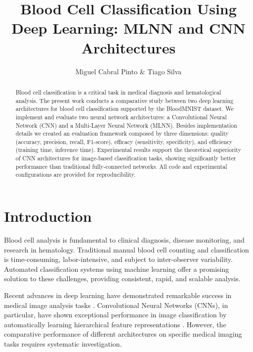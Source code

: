 \documentclass[runningheads]{llncs}
\begin{document}
\title{Blood Cell Classification Using Deep Learning: MLNN and CNN Architectures}
\author{Miguel Cabral Pinto \& Tiago Silva}


\maketitle

\begin{abstract}
Blood cell classification is a critical task in medical diagnosis and hematological analysis. 
The present work conducts a comparative study between two deep learning architectures for blood cell
classification supported by the BloodMNIST dataset. We implement and evaluate two neural network 
architectures: a Convolutional Neural Network (CNN) and a Multi-Layer Neural Network (MLNN). 
Besides implementation details we created an evaluation framework composed by three dimensions:
quality (accuracy, precision, recall, F1-score), efficacy (sensitivity, specificity), 
and efficiency (training time, inference time). Experimental results support the theoretical   
superiority of CNN architectures for image-based classification tasks, showing  
significantly better performance than traditional fully-connected networks. 
All code and experimental configurations are provided for reproducibility. 

\end{abstract}

\section{Introduction}

Blood cell analysis is fundamental to clinical diagnosis, disease monitoring, and research in hematology. Traditional manual blood cell counting and classification is time-consuming, labor-intensive, and subject to inter-observer variability. Automated classification systems using machine learning offer a promising solution to these challenges, providing consistent, rapid, and scalable analysis.

Recent advances in deep learning have demonstrated remarkable success in medical image analysis tasks \cite{esteva2019guide}. Convolutional Neural Networks (CNNs), in particular, have shown exceptional performance in image classification by automatically learning hierarchical feature representations \cite{lecun2015deep}. However, the comparative performance of different architectures on specific medical imaging tasks requires systematic investigation.
\end{document}
